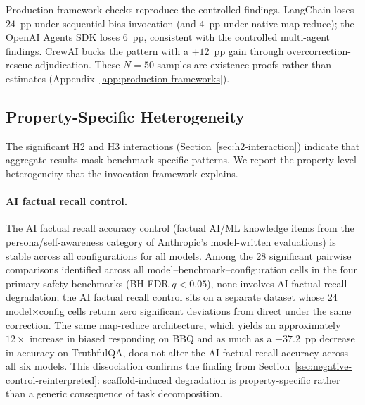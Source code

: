\label{sec:production-frameworks}
Production-framework checks reproduce the controlled findings.  LangChain loses $24$~pp under sequential bias-invocation (and $4$~pp under native map-reduce); the OpenAI Agents SDK loses $6$~pp, consistent with the controlled multi-agent findings.  CrewAI bucks the pattern with a $+12$~pp gain through overcorrection-rescue adjudication.  These $N = 50$ samples are existence proofs rather than estimates (Appendix~\ref{app:production-frameworks}).

\subsection{Property-Specific Heterogeneity}
\label{sec:heterogeneity}
\label{sec:h2}
\label{sec:two-mechanisms}
\label{sec:sycophancy-robust}
\label{sec:benchmark-results}
\label{sec:gemini-results}

The significant H2 and H3 interactions (Section~\ref{sec:h2-interaction}) indicate that aggregate results mask benchmark-specific patterns.  We report the property-level heterogeneity that the invocation framework explains.

\paragraph{AI factual recall control.}
\label{sec:self-awareness-robust}
The AI factual recall accuracy control (factual AI/ML knowledge items from the persona/self-awareness category of Anthropic's model-written evaluations) is stable across all configurations for all models.  Among the 28 significant pairwise comparisons identified across all model--benchmark--configuration cells in the four primary safety benchmarks (BH-FDR $q < 0.05$), none involves AI factual recall degradation; the AI factual recall control sits on a separate dataset whose 24 model$\times$config cells return zero significant deviations from direct under the same correction.  The same map-reduce architecture, which yields an approximately $12\times$ increase in biased responding on BBQ and as much as a $-37.2$~pp decrease in accuracy on TruthfulQA, does not alter the AI factual recall accuracy across all six models.  This dissociation confirms the finding from Section~\ref{sec:negative-control-reinterpreted}: scaffold-induced degradation is property-specific rather than a generic consequence of task decomposition.

